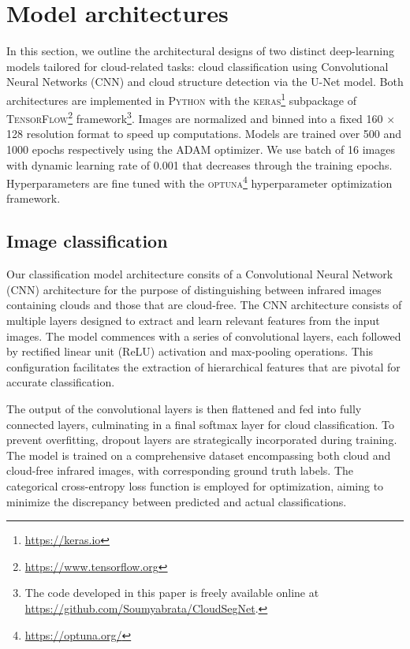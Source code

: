 \documentclass[remotesensing,article,submit,pdftex,moreauthors]{Definitions/mdpi}
\begin{document}
\section{Model architectures}

In this section, we outline the architectural designs of two distinct deep-learning models tailored for cloud-related tasks: cloud classification using Convolutional Neural Networks (CNN) and cloud structure detection via the U-Net model. Both architectures are implemented in \textsc{Python} with the \textsc{keras}\footnote{\url{https://keras.io}} subpackage of \textsc{TensorFlow}\footnote{\url{https://www.tensorflow.org}} framework\footnote{The code developed in this paper is freely available online at \url{https://github.com/Soumyabrata/CloudSegNet}.}. Images are normalized and binned into a fixed 160 $\times$ 128 resolution format to speed up computations. Models are trained over 500 and 1000 epochs respectively using the ADAM optimizer. We use batch of 16 images with dynamic learning rate of 0.001 that decreases through the training epochs. Hyperparameters are fine tuned with the \textsc{optuna}\footnote{\url{https://optuna.org/}} hyperparameter optimization framework.

\subsection{Image classification}

Our classification model architecture consits of a Convolutional Neural Network (CNN) architecture for the purpose of distinguishing between infrared images containing clouds and those that are cloud-free. The CNN architecture consists of multiple layers designed to extract and learn relevant features from the input images. The model commences with a series of convolutional layers, each followed by rectified linear unit (ReLU) activation and max-pooling operations. This configuration facilitates the extraction of hierarchical features that are pivotal for accurate classification.

The output of the convolutional layers is then flattened and fed into fully connected layers, culminating in a final softmax layer for cloud classification. To prevent overfitting, dropout layers are strategically incorporated during training. The model is trained on a comprehensive dataset encompassing both cloud and cloud-free infrared images, with corresponding ground truth labels. The categorical cross-entropy loss function is employed for optimization, aiming to minimize the discrepancy between predicted and actual classifications.
\end{document}
